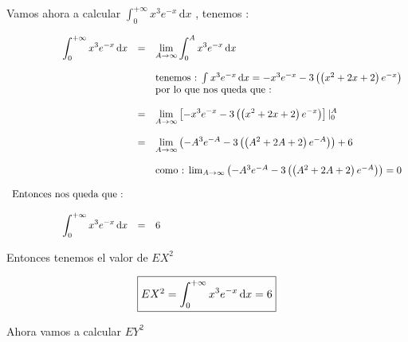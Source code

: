 \documentclass[12pt]{article}
\begin{document}
    \begin{flushleft}
        Vamos ahora a calcular $\int_{0}^{+\infty}  x^3 e^{-x} \,\mathrm{d}x$ , tenemos : 
    \end{flushleft}
    \begin{equation*}
        \begin{array}{rcl}
            \displaystyle \int_{0}^{+\infty}  x^3 e^{-x} \,\mathrm{d}x & = & \displaystyle \lim_{A \to \infty}  \int_{0}^{A}  x^3 e^{-x} \,\mathrm{d}x
            \\
            \\
            && \mbox{tenemos : $ \int_{}^{}  x^3 e^{-x} \,\mathrm{d}x = - x^3e^{-x} - 3 \left(\left(x^2+ 2x + 2\right)e^{-x}\right)$} 
            \\
            && \mbox{por lo que nos queda que :}
            \\
            \\
            & = &\displaystyle \lim_{A \to \infty}  \left[- x^3e^{-x} - 3 \left(\left(x^2+ 2x + 2\right)e^{-x}\right)\right] \vert_{0}^{A}
            \\
            \\
            & = & \displaystyle \lim_{A \to \infty}  \left(- A^3e^{-A} - 3 \left(\left(A^2+ 2A + 2\right)e^{-A}\right)\right) + 6 
            \\
            \\
            && \mbox{como : $\lim_{A \to \infty}  \left(- A^3e^{-A} - 3 \left(\left(A^2+ 2A + 2\right)e^{-A}\right)\right) = 0 $}
            \\
            \\
            \mbox{Entonces nos queda que : }&&
            \\
            \\
            \displaystyle \int_{0}^{+\infty}  x^3 e^{-x} \,\mathrm{d}x & = & 6
        \end{array}
    \end{equation*}

    \begin{flushleft}
        Entonces tenemos el valor de $EX^2$
    \end{flushleft}

    \begin{equation*}
        \fbox{$
            EX^2 = \displaystyle \int_{0}^{+\infty}  x^3 e^{-x} \,\mathrm{d}x  =  6
        $}
    \end{equation*}

    \begin{flushleft}
        Ahora vamos a calcular $EY^2$
    \end{flushleft}
\end{document}
